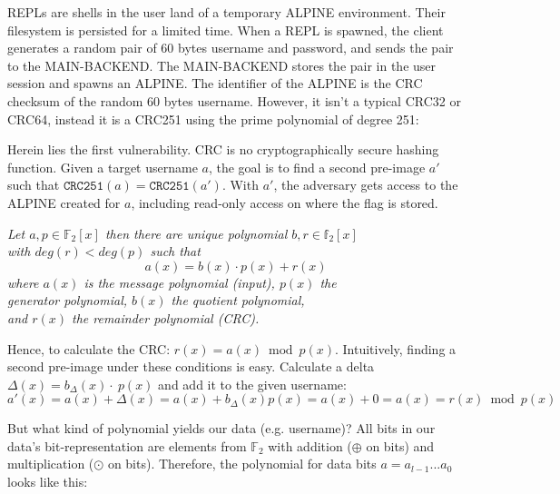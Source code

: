 \documentclass[10pt]{article}
\newcommand{\definition}[2]{
\begin{tcolorbox}[
		title={#1},hbox,
		colframe=green!75!black,
		colback=green!40!white,
		coltitle=black,
	]
    \begin{varwidth}{\textwidth}
		#2
    \end{varwidth}
\end{tcolorbox}
}
\begin{document}
REPLs are  shells in the user land of a temporary ALPINE environment. Their filesystem is persisted for a limited time. When a REPL is spawned, the client generates a random pair of 60 bytes username and password, and sends the pair to the MAIN-BACKEND. The MAIN-BACKEND stores the pair in the user session and spawns an ALPINE. The identifier of the ALPINE is the CRC checksum of the random 60 bytes username. However, it isn't a typical CRC32 or CRC64, instead it is a CRC251 using the prime polynomial of degree 251:
\begin{center}
\end{center}

Herein lies the first vulnerability. CRC is no cryptographically secure hashing function. Given a target username $a$, the goal is to find a second pre-image $a'$ such that $\texttt{CRC251}(a) = \texttt{CRC251}(a')$. With $a'$, the adversary gets access to the ALPINE created for $a$, including read-only access on  where the flag is stored. \\

\begin{center}
	\definition{CRC}{
	\textit{Let $a, p \in \mathds{F}_2[x]$ then there are unique polynomial $b, r \in \mathds{f}_2[x]$ \\ with $deg(r) < deg(p)$ such that}
	\begin{equation*}
		a(x) = b(x) \cdot p(x) + r(x)
	\end{equation*}
	\textit{where $a(x)$ is the message polynomial (input), $p(x)$ the \\ generator polynomial, $b(x)$ the quotient polynomial, \\ and $r(x)$ the remainder polynomial (CRC).}
	}
\end{center}

\vspace*{.4cm}
Hence, to calculate the CRC: $r(x) = a(x)\bmod p(x)$. Intuitively, finding a second pre-image under these conditions is easy. Calculate a delta $\Delta(x) = b_\Delta(x) \cdot\ p(x)$ and add it to the given username:
\begin{equation}
	a'(x) = a(x) + \Delta(x) = a(x) + b_\Delta(x)p(x) = a(x) + 0 = a(x) = r(x) \bmod p(x)
\end{equation}

But what kind of polynomial yields our data (e.g. username)? All bits in our data's bit-representation are elements from $\mathds{F}_2$ with addition ($\oplus$ on bits) and multiplication ($\odot$ on bits). Therefore, the polynomial for data bits $a=a_{l-1}...a_0$ looks like this:
\end{document}
